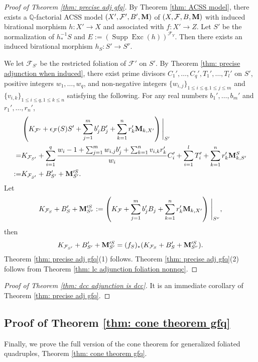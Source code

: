 \documentclass[11pt]{amsart}
\numberwithin{equation}{section}
\newcommand{\Mm}{{\bf{M}}}
\newcommand{\Qq}{\mathbb{Q}}
\newcommand{\Exc}{\operatorname{Exc}}
\newcommand{\Supp}{\operatorname{Supp}}
\newcommand{\Ff}{\mathcal{F}}
\theoremstyle{definition}
\theoremstyle{definition}
\theoremstyle{definition}
\begin{document}
\begin{proof}[Proof of Theorem \ref{thm: precise adj gfq}]
By Theorem \ref{thm:  ACSS model}, there exists a $\Qq$-factorial ACSS model $(X',\Ff',B',\Mm)$ of $(X,\Ff,B,\Mm)$ with induced birational morphism $h: X'\rightarrow X$ and associated with $f: X'\rightarrow Z$. Let $S'$ be the normalization of $h^{-1}_*S$ and $E:=(\Supp\Exc(h))^{\Ff_Y}$.  Then there exists an induced birational morphism $h_S: S'\rightarrow S^\nu$.
    
We let $\Ff_{S'}$ be the restricted foliation of $\Ff'$ on $S'$. By Theorem \ref{thm: precise adjunction when induced}, there exist prime divisors $C_1',\dots,C_q',T_1',\dots,T_l'$ on $S'$, positive integers $w_1,\dots,w_q$, and non-negative integers $\{w_{i,j}\}_{1\leq i\leq q,1\leq j\leq m}$ and $\{v_{i,k}\}_{1\leq i\leq q, 1\leq k\leq n}$ satisfying the following. For any real numbers $b_1',\dots,b_m'$ and $r_1',\dots,r_n'$,
     \begin{align*}
&\left(K_{\Ff'}+\epsilon_{\Ff}(S)S'+\sum_{j=1}^mb_j'B_j'+\sum_{k=1}^nr_k'\Mm_{k,X'}\right)\Bigg|_{S'}\\
=&K_{\Ff_{S'}}+\sum_{i=1}^q\frac{w_i-1+\sum_{j=1}^mw_{i,j}b_j'+\sum_{k=1}^nv_{i,k}r_k'}{w_i}C_i'+\sum_{i=1}^lT_i'+\sum_{k=1}^nr_k'\Mm_{k,S'}^S\\
:=&K_{\Ff_{S'}}+B'_{S'}+\Mm'^S_{S'}.
\end{align*}
Let
$$K_{\Ff_S}+B'_S+\Mm'^S_{S^\nu}:=\left(K_{\Ff}+\sum_{j=1}^mb_j'B_j+\sum_{k=1}^nr_k'\Mm_{k,X'}\right)\Biggm|_{S^\nu},$$
then
 $$K_{\Ff_{S'}}+B'_{S'}+\Mm'^S_{S'}=(f_S)_*(K_{\Ff_{S}}+B'_{S}+\Mm'^S_{S^\nu}).$$
 Theorem \ref{thm: precise adj gfq}(1) follows.  Theorem \ref{thm: precise adj gfq}(2) follows from Theorem \ref{thm: lc adjunction foliation nonnqc}.
\end{proof}

\begin{proof}[Proof of Theorem \ref{thm: dcc adjunction is dcc}]
    It is an immediate corollary of Theorem \ref{thm: precise adj gfq}.
\end{proof}

\subsection{Proof of Theorem \ref{thm: cone theorem gfq}}\label{subsec: proof of cone}

Finally, we prove the full version of the cone theorem for generalized foliated quadruples, Theorem \ref{thm: cone theorem gfq}.
\end{document}
